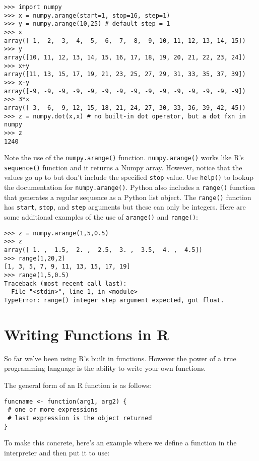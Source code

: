\begin{lstlisting}
>>> import numpy
>>> x = numpy.arange(start=1, stop=16, step=1)
>>> y = numpy.arange(10,25) # default step = 1
>>> x
array([ 1,  2,  3,  4,  5,  6,  7,  8,  9, 10, 11, 12, 13, 14, 15])
>>> y
array([10, 11, 12, 13, 14, 15, 16, 17, 18, 19, 20, 21, 22, 23, 24])
>>> x+y
array([11, 13, 15, 17, 19, 21, 23, 25, 27, 29, 31, 33, 35, 37, 39])
>>> x-y
array([-9, -9, -9, -9, -9, -9, -9, -9, -9, -9, -9, -9, -9, -9, -9])
>>> 3*x
array([ 3,  6,  9, 12, 15, 18, 21, 24, 27, 30, 33, 36, 39, 42, 45])
>>> z = numpy.dot(x,x) # no built-in dot operator, but a dot fxn in numpy
>>> z
1240
\end{lstlisting}
Note the use of the \lstinline!numpy.arange()! function.
\lstinline!numpy.arange()! works like R's \lstinline!sequence()!
function and it returns a Numpy array. However, notice that the values
go up to but don't include the specified \lstinline!stop! value. Use
\lstinline!help()! to lookup the documentation for
\lstinline!numpy.arange()!. Python also includes a \lstinline!range()!
function that generates a regular sequence as a Python list object. The
\lstinline!range()! function has \lstinline!start!, \lstinline!stop!,
and \lstinline!step! arguments but these can only be integers. Here are
some additional examples of the use of \lstinline!arange()! and
\lstinline!range()!:

\begin{lstlisting}
>>> z = numpy.arange(1,5,0.5) 
>>> z
array([ 1. ,  1.5,  2. ,  2.5,  3. ,  3.5,  4. ,  4.5])
>>> range(1,20,2)
[1, 3, 5, 7, 9, 11, 13, 15, 17, 19]
>>> range(1,5,0.5)
Traceback (most recent call last):
  File "<stdin>", line 1, in <module>
TypeError: range() integer step argument expected, got float.
\end{lstlisting}

\section{Writing Functions in R}

So far we've been using R's built in functions. However the power of a
true programming language is the ability to write your own functions.

The general form of an R function is as follows:

\begin{lstlisting}
funcname <- function(arg1, arg2) {
 # one or more expressions
 # last expression is the object returned
}
\end{lstlisting}
To make this concrete, here's an example where we define a function in
the interpreter and then put it to use:


